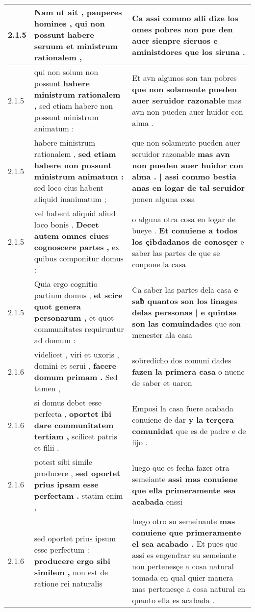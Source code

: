 \begin{tabular}{|p{1cm}|p{6.5cm}|p{6.5cm}|}
2.1.5 & Nam ut ait , pauperes homines , \textbf{ qui non possunt habere seruum } et ministrum rationalem , & Ca assi commo alli dize los omes pobres \textbf{ non pue den auer sienpre sieruos } e aministdores que los siruna . \\\hline
2.1.5 & qui non solum non possunt \textbf{ habere ministrum rationalem , } sed etiam habere non possunt ministrum animatum : & Et avn algunos son tan pobres \textbf{ que non solamente pueden auer seruidor razonable } mas avn non pueden auer huidor con alma . \\\hline
2.1.5 & habere ministrum rationalem , \textbf{ sed etiam habere non possunt ministrum animatum : } sed loco eius habent aliquid inanimatum ; & que non solamente pueden auer seruidor razonable \textbf{ mas avn non pueden auer huidor con alma . | assi commo bestia anas en logar de tal seruidor } ponen alguna cosa \\\hline
2.1.5 & vel habent aliquid aliud loco bonis . \textbf{ Decet autem omnes ciues cognoscere partes , } ex quibus componitur domus : & o alguna otra cosa en logar de bueye . \textbf{ Et conuiene a todos los çibdadanos de conosçer } e saber las partes de que se conpone la casa \\\hline
2.1.5 & Quia ergo cognitio partium domus , \textbf{ et scire quot genera personarum , } et quot communitates requiruntur ad domum : & Ca saber las partes dela casa \textbf{ e saƀ quantos son los linages delas perssonas | e quintas son las comuindades } que son menester ala casa \\\hline
2.1.6 & videlicet , viri et uxoris , domini et serui , \textbf{ facere domum primam . } Sed tamen , & sobredicho dos comuni dades \textbf{ fazen la primera casa } o nuene de saber et uaron \\\hline
2.1.6 & si domus debet esse perfecta , \textbf{ oportet ibi dare communitatem tertiam , } scilicet patris et filii . & Emposi la casa fuere acabada conuiene de dar \textbf{ y la terçera comunidat } que es de padre e de fijo . \\\hline
2.1.6 & potest sibi simile producere , \textbf{ sed oportet prius ipsam esse perfectam . } statim enim , & luego que es fecha fazer otra semeiante \textbf{ assi mas conuiene que ella primeramente sea acabada } enssi \\\hline
2.1.6 & sed oportet prius ipsum esse perfectum : \textbf{ producere ergo sibi similem , } non est de ratione rei naturalis & luego otro su semeinante \textbf{ mas conuiene que primeramente el sea acabado . } Et pues que assi es engendrar su semeiante non pertenesçe a cosa natural tomada en qual quier manera mas pertenesçe a cosa natural en quanto ella es acabada . \\\hline

\end{tabular}
